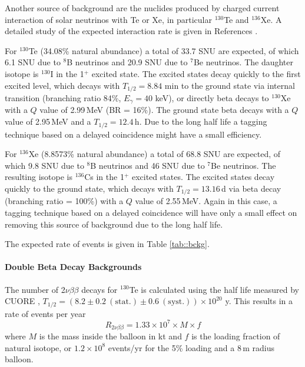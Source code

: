 Another source of background are the nuclides produced by charged current
interaction of solar neutrinos with Te or Xe, in particular $^{130}$Te and
$^{136}$Xe. A detailed study of the expected interaction rate is given in
References \cite{eijiri14, eijiri17}. 

For $^{130}$Te (34.08\% natural abundance) a total of 33.7 SNU are expected,
of which 6.1 SNU due to $^{8}$B neutrinos and 20.9 SNU due to $^{7}$Be
neutrinos. The daughter isotope is $^{130}$I in the 1$^{+}$ excited state.
The excited states decay quickly to the first excited level, which decays with
$T_{1/2}=8.84$ min to the ground state via internal transition (branching
ratio 84\%, $E_\gamma=40$ keV), or directly beta decays to $^{130}$Xe with a
$Q$ value of 2.99\,MeV (BR = 16\%). The ground state beta decays with a
$Q$ value of 2.95\,MeV and a $T_{1/2}=12.4$\,h. Due to the long half life a
tagging technique based on a delayed coincidence might have a small efficiency.

For $^{136}$Xe (8.8573\% natural abundance) a total of 68.8 SNU are expected,
of which 9.8 SNU due to $^{8}$B neutrinos and 46 SNU due to $^{7}$Be neutrinos.
The resulting isotope is $^{136}$Cs in the 1$^{+}$ excited states. The
excited states decay quickly to the ground state, which decays with
$T_{1/2}=13.16$\,d via beta decay (branching ratio = 100\%) with a $Q$ value
of 2.55\,MeV. Again in this case, a tagging technique
based on a delayed coincidence will have only a small effect on removing this
source of background due to the long half life.

The expected rate of events is given in Table \ref{tab::bckg}.

\paragraph{Double Beta Decay Backgrounds}

The number of 2$\nu\beta\beta$ decays for $^{130}$Te is calculated using the
half life measured by CUORE \cite{Cuore017},
$T_{1/2}=(8.2\pm0.2~\mathrm{(stat.)}\pm0.6~\mathrm{(syst.)})\times 10^{20}$ y.
This results in a rate of events per year
\begin{equation}
R_{2\nu\beta\beta} = 1.33 \times 10^{7} \times M \times f
\end{equation} 
where $M$ is the mass inside the balloon in kt and $f$ is the loading fraction
of natural isotope, or $1.2\times10^8$ events/yr for the 5\% loading and a
8\,m radius balloon.\\
 
